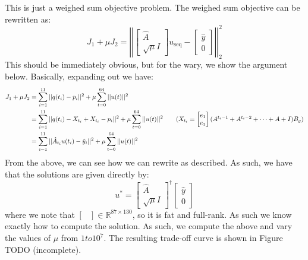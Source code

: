 \documentclass[12pt]{exam}
\begin{document}
\begin{questions}
\begin{solution}
\begin{enumerate}[label=(\alph*)]
        This is just a weighed sum objective problem. The weighed sum objective can be rewritten as:
        \[
          J_1 + \mu J_2 = \left|\left|
          \begin{bmatrix}
            \hat{A} \\ \sqrt{\mu}I 
          \end{bmatrix}u_{\text{seq}} - \begin{bmatrix} \hat{y} \\ 0  \end{bmatrix} \right|\right|_2^2
        \]
        This should be immediately obvious, but for the wary, we show the argument below. Basically, expanding out we have:
        \begin{align*}
          J_1 + \mu J_2 &= \sum_{i=1}^{11} ||q(t_i) - p_i ||^2 + \mu \sum_{t=0}^{64}||u(t)||^2 \\
          &= \sum_{i=1}^{11} ||q(t_i) - X_{t_i} + X_{t_i} - p_i ||^2 + \mu \sum_{t=0}^{64}||u(t)||^2 \tag{$X_{t_i} = \begin{bmatrix} e_1 \\ e_3 \end{bmatrix}(A^{t_i-1} + A^{t_i-2} + \cdots + A + I)B_g$} \\
          &=\sum_{i=1}^{11} ||\hat{A}_{t_i}u(t_i) - \hat{y}_i ||^2 + \mu \sum_{t=0}^{64}||u(t)||^2 
        \end{align*}
        From the above, we can see how we can rewrite as described. As such, we have that the solutions are given directly by:
        \[
          u^* = \begin{bmatrix}
            \hat{A} \\ \sqrt{\mu}I 
          \end{bmatrix}^{\dagger}\begin{bmatrix} \hat{y} \\ 0 \end{bmatrix}
        \]
        where we note that $\begin{bmatrix} \end{bmatrix} \in \mathbb{R}^{87 \times 130}$, so it is fat and full-rank. As such we know exactly how to compute the solution.
        As such, we compute the above and vary the values of $\mu$ from $1 to 10^7$. The resulting trade-off curve is shown in Figure TODO (incomplete).


\end{enumerate}
\end{solution}
\end{questions}
\end{document}
